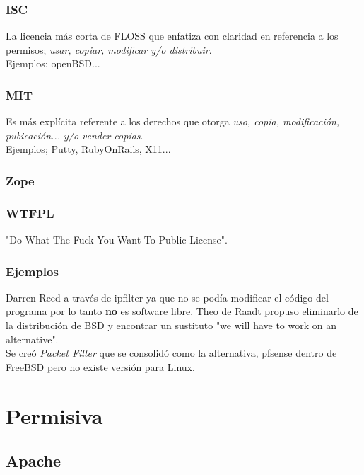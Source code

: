 \documentclass[11pt]{scrartcl}
\begin{document}
\subsubsection{ISC}

La licencia m\'as corta de FLOSS que enfatiza con claridad en referencia a los permisos; \emph{usar, copiar, modificar y/o distribuir}.\\
Ejemplos; openBSD...

\subsubsection{MIT}

Es m\'as expl\'icita referente a los derechos que otorga \emph{uso, copia, modificaci\'on, pubicaci\'on... y/o vender copias}.\\
Ejemplos; Putty, RubyOnRails, X11...

\subsubsection{Zope}

\subsubsection{WTFPL}

"Do What The Fuck You Want To Public License".

\subsubsection{Ejemplos}

Darren Reed a trav\'es de ipfilter ya que no se pod\'ia modificar el c\'odigo del programa por lo tanto \textbf{no} es software libre.
Theo de Raadt propuso eliminarlo de la distribuci\'on de BSD y encontrar un sustituto "we will have to work on an alternative".\\
Se cre\'o \emph{Packet Filter} que se consolid\'o como la alternativa, pfsense dentro de FreeBSD pero no existe versi\'on para Linux.

\section{Permisiva}

\subsection{Apache}
\end{document}
